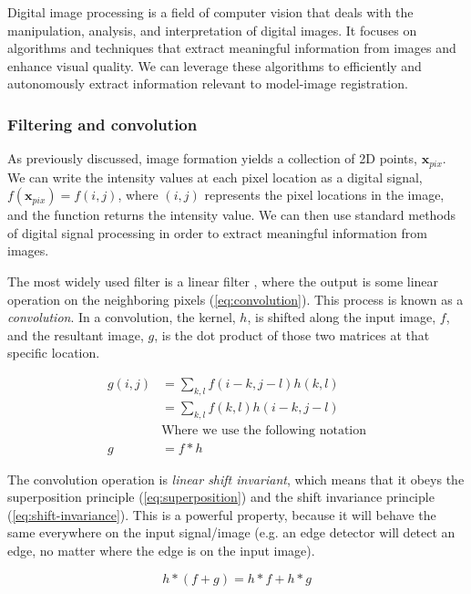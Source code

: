Digital image processing is a field of computer vision that deals with the manipulation, analysis, and interpretation of digital images.
It focuses on algorithms and techniques that extract meaningful information from images and enhance visual quality.
We can leverage these algorithms to efficiently and autonomously extract information relevant to model-image registration.

\subsubsection{Filtering and convolution}
\label{sec:filtering-convolution}
As previously discussed, image formation yields a collection of 2D points, $\mathbf{x}_{pix}$.
We can write the intensity values at each pixel location as a digital signal, $f(\mathbf{x}_{pix}) = f(i,j)$, where $(i,j)$ represents the pixel locations in the image, and the function returns the intensity value.
We can then use standard methods of digital signal processing in order to extract meaningful information from images.

The most widely used filter is a linear filter \cite{szeliskiComputerVisionAlgorithms2022}, where the output is some linear operation on the neighboring pixels (\cref{eq:convolution}).
This process is known as a \emph{convolution}.
In a convolution, the kernel, $h$, is shifted along the input image, $f$, and the resultant image, $g$, is the dot product of those two matrices at that specific location.

\begin{equation}
    \begin{aligned}
        g(i,j) &= \sum_{k,l}f(i-k,j-l)h(k,l) \\
        &= \sum_{k,l}f(k,l)h(i-k,j-l) \\
        &\text{Where we use the following notation}\\
        g&= f * h
    \end{aligned}
    \label{eq:convolution}
\end{equation}

The convolution operation is \emph{linear shift invariant}, which means that it obeys the superposition principle (\cref{eq:superposition}) and the shift invariance principle (\cref{eq:shift-invariance}).
This is a powerful property, because it will behave the same everywhere on the input signal/image (e.g. an edge detector will detect an edge, no matter where the edge is on the input image).

\begin{equation}
    h *(f + g) = h*f + h*g
    \label{eq:superposition}
\end{equation}

